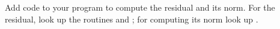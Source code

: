   Add code to your program to compute the residual and its norm. For
  the residual, look up the routines  and ;
  for computing its norm look up .
